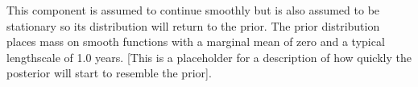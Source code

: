 This component is assumed to continue smoothly but is also assumed to be stationary so its distribution will return to the prior.
The prior distribution places mass on smooth functions with a marginal mean of zero and a typical lengthscale of 1.0 years.
[This is a placeholder for a description of how quickly the posterior will start to resemble the prior].